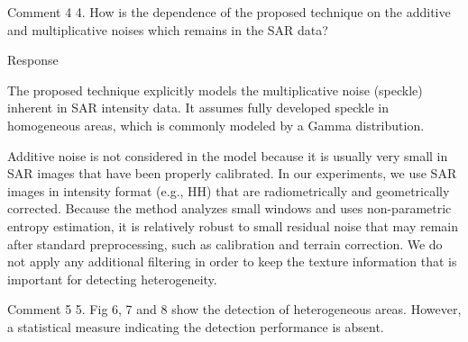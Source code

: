 \documentclass[11pt]{report}
\begin{document}
\vspace{5em}
\begin{reviewbox}{Comment 4}
4. How is the dependence of the proposed technique on the additive and multiplicative noises which remains in the SAR data?
\end{reviewbox}
\begin{responsebox}{Response}


The proposed technique explicitly models the multiplicative noise (speckle) inherent in SAR intensity data. 
It assumes fully developed speckle in homogeneous areas, which is commonly modeled by a Gamma distribution. 

Additive noise is not considered in the model because it is usually very small in SAR images that have been properly calibrated.
 In our experiments, we use SAR images in intensity format (e.g., HH) that are radiometrically and geometrically corrected. 
Because the method analyzes small windows and uses non-parametric entropy estimation, it is relatively robust to small residual noise that may remain after standard preprocessing, such as calibration and terrain correction. 
We do not apply any additional filtering in order to keep the texture information that is important for detecting heterogeneity.


\end{responsebox}

\vspace{2em}
\begin{reviewbox}{Comment 5}
5. Fig 6, 7 and 8 show the detection of heterogeneous areas. However, a statistical measure indicating the detection performance is absent.
\end{reviewbox}
\end{document}
